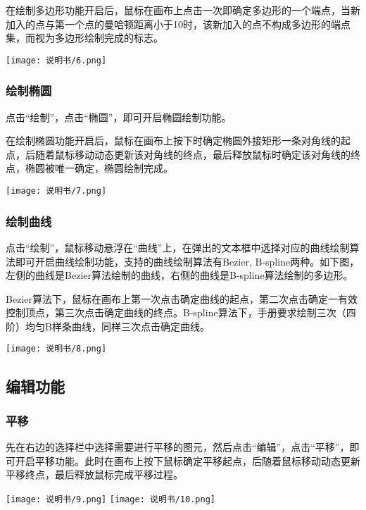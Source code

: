 \documentclass{article}
\begin{document}
		在绘制多边形功能开启后，鼠标在画布上点击一次即确定多边形的一个端点，当新加入的点与第一个点的曼哈顿距离小于10时，该新加入的点不构成多边形的端点集，而视为多边形绘制完成的标志。
		\begin{center}
			\texttt{[image: 说明书/6.png]}
		\end{center}
	
		\subsubsection{绘制椭圆}
		点击“绘制”，点击“椭圆”，即可开启椭圆绘制功能。
		
		在绘制椭圆功能开启后，鼠标在画布上按下时确定椭圆外接矩形一条对角线的起点，后随着鼠标移动动态更新该对角线的终点，最后释放鼠标时确定该对角线的终点，椭圆被唯一确定，椭圆绘制完成。
		\begin{center}
			\texttt{[image: 说明书/7.png]}
		\end{center}
		
		\subsubsection{绘制曲线}
		点击“绘制”，鼠标移动悬浮在“曲线”上，在弹出的文本框中选择对应的曲线绘制算法即可开启曲线绘制功能，支持的曲线绘制算法有Bezier, B-spline两种。如下图，左侧的曲线是Bezier算法绘制的曲线，右侧的曲线是B-spline算法绘制的多边形。
		
		Bezier算法下，鼠标在画布上第一次点击确定曲线的起点，第二次点击确定一有效控制顶点，第三次点击确定曲线的终点。B-spline算法下，手册要求绘制三次（四阶）均匀B样条曲线，同样三次点击确定曲线。
		\begin{center}
			\texttt{[image: 说明书/8.png]}
		\end{center}
	
		\subsection{编辑功能}
		\subsubsection{平移}
		先在右边的选择栏中选择需要进行平移的图元，然后点击“编辑”，点击“平移”，即可开启平移功能。此时在画布上按下鼠标确定平移起点，后随着鼠标移动动态更新平移终点，最后释放鼠标完成平移过程。
		\begin{center}
			\texttt{[image: 说明书/9.png]}
			\texttt{[image: 说明书/10.png]}
		\end{center}
	
\end{document}
